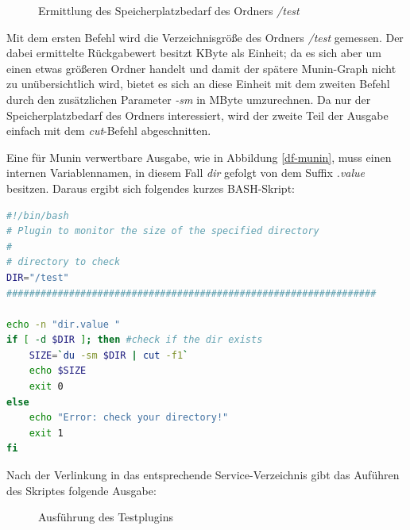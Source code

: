 \begin{figure}[ht]
	\centering
		\caption{Ermittlung des Speicherplatzbedarf des Ordners \textit{/test}}
		\label{du1}
\end{figure}

Mit dem ersten Befehl wird die Verzeichnisgröße des Ordners \textit{/test} gemessen.
Der dabei ermittelte Rückgabewert besitzt KByte als Einheit; da es sich aber um einen etwas größeren Ordner handelt und damit der spätere Munin-Graph nicht zu unübersichtlich wird, bietet es sich an diese Einheit mit dem zweiten Befehl durch den zusätzlichen Parameter \textit{-sm} in MByte umzurechnen.
Da nur der Speicherplatzbedarf des Ordners interessiert, wird der zweite Teil der Ausgabe einfach mit dem \textit{cut}-Befehl abgeschnitten.

Eine für Munin verwertbare Ausgabe, wie in Abbildung \ref{df-munin}, muss einen internen Variablennamen, in diesem Fall \textit{dir}  gefolgt von dem Suffix \textit{.value} besitzen.
Daraus ergibt sich folgendes kurzes BASH-Skript:

\begin{lstlisting}[captionpos=b, caption=Speicherplatzbedarf eines Verzeichnises, label=du, breaklines = true, language=bash]
#!/bin/bash
# Plugin to monitor the size of the specified directory
#
# directory to check
DIR="/test"
#################################################################

echo -n "dir.value "
if [ -d $DIR ]; then #check if the dir exists
    SIZE=`du -sm $DIR | cut -f1`
    echo $SIZE
    exit 0
else
    echo "Error: check your directory!"
    exit 1
fi
\end{lstlisting}

Nach der Verlinkung in das entsprechende Service-Verzeichnis gibt das Auführen des Skriptes folgende Ausgabe:

\begin{figure}[ht]
	\centering
		\caption{Ausführung des Testplugins}
		\label{du2}
\end{figure}

